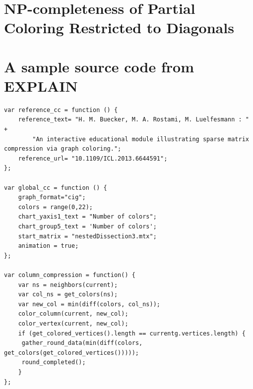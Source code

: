 \documentclass[11pt, twoside,a4paper]{book}
\begin{document}
\chapter{NP-completeness of Partial Coloring Restricted to Diagonals}
\label{app.npcomp}
\cite{np-complet-graph-coloring}

\chapter{A sample source code from EXPLAIN}
\label{app.source}
\begin{lstlisting}
var reference_cc = function () {
    reference_text= "H. M. Buecker, M. A. Rostami, M. Luelfesmann : " +
        "An interactive educational module illustrating sparse matrix compression via graph coloring.";
    reference_url= "10.1109/ICL.2013.6644591";
};

var global_cc = function () {
    graph_format="cig";
    colors = range(0,22);
    chart_yaxis1_text = "Number of colors";
    chart_group5_text = 'Number of colors';
    start_matrix = "nestedDissection3.mtx";
    animation = true;
};

var column_compression = function() {
    var ns = neighbors(current);
    var col_ns = get_colors(ns);
    var new_col = min(diff(colors, col_ns));
    color_column(current, new_col);
    color_vertex(current, new_col);
    if (get_colored_vertices().length == currentg.vertices.length) {
     gather_round_data(min(diff(colors, get_colors(get_colored_vertices()))));
     round_completed();
    }
};
\end{lstlisting}
\end{document}
